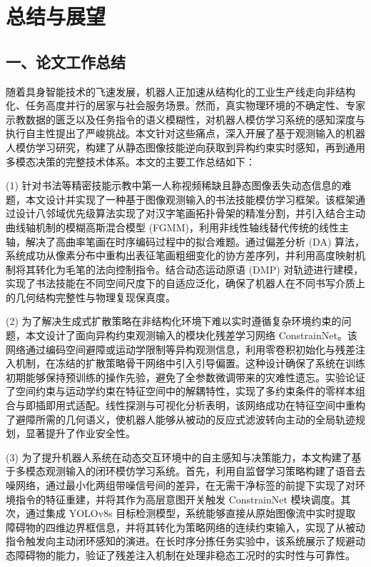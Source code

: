 \chapter{总结与展望}
\section*{一、论文工作总结}
随着具身智能技术的飞速发展，机器人正加速从结构化的工业生产线走向非结构化、任务高度并行的居家与社会服务场景。然而，真实物理环境的不确定性、专家示教数据的匮乏以及任务指令的语义模糊性，对机器人模仿学习系统的感知深度与执行自主性提出了严峻挑战。本文针对这些痛点，深入开展了基于观测输入的机器人模仿学习研究，构建了从静态图像技能逆向获取到异构约束实时感知，再到通用多模态决策的完整技术体系。本文的主要工作总结如下：

(1) 针对书法等精密技能示教中第一人称视频稀缺且静态图像丢失动态信息的难题，本文设计并实现了一种基于图像观测输入的书法技能模仿学习框架。该框架通过设计八邻域优先级算法实现了对汉字笔画拓扑骨架的精准分割，并引入结合主动曲线轴机制的模糊高斯混合模型 (FGMM)，利用非线性轴线替代传统的线性主轴，解决了高曲率笔画在时序编码过程中的拟合难题。通过偏差分析 (DA) 算法，系统成功从像素分布中重构出表征笔画粗细变化的协方差序列，并利用高度映射机制将其转化为毛笔的法向控制指令。结合动态运动原语 (DMP) 对轨迹进行建模，实现了书法技能在不同空间尺度下的自适应泛化，确保了机器人在不同书写介质上的几何结构完整性与物理复现保真度。

(2) 为了解决生成式扩散策略在非结构化环境下难以实时遵循复杂环境约束的问题，本文设计了面向异构约束观测输入的模块化残差学习网络 ConstrainNet。该网络通过编码空间避障或运动学限制等异构观测信息，利用零卷积初始化与残差注入机制，在冻结的扩散策略骨干网络中引入引导偏置。这种设计确保了系统在训练初期能够保持预训练的操作先验，避免了全参数微调带来的灾难性遗忘。实验论证了空间约束与运动学约束在特征空间中的解耦特性，实现了多约束条件的零样本组合与即插即用式适配。线性探测与可视化分析表明，该网络成功在特征空间中重构了避障所需的几何语义，使机器人能够从被动的反应式滤波转向主动的全局轨迹规划，显著提升了作业安全性。

(3) 为了提升机器人系统在动态交互环境中的自主感知与决策能力，本文构建了基于多模态观测输入的闭环模仿学习系统。首先，利用自监督学习策略构建了语音去噪网络，通过最小化两组带噪信号间的差异，在无需干净标签的前提下实现了对环境指令的特征重建，并将其作为高层意图开关触发 ConstrainNet 模块调度。其次，通过集成 YOLOv8s 目标检测模型，系统能够直接从原始图像流中实时提取障碍物的四维边界框信息，并将其转化为策略网络的连续约束输入，实现了从被动指令触发向主动闭环感知的演进。在长时序分拣任务实验中，该系统展示了规避动态障碍物的能力，验证了残差注入机制在处理非稳态工况时的实时性与可靠性。


